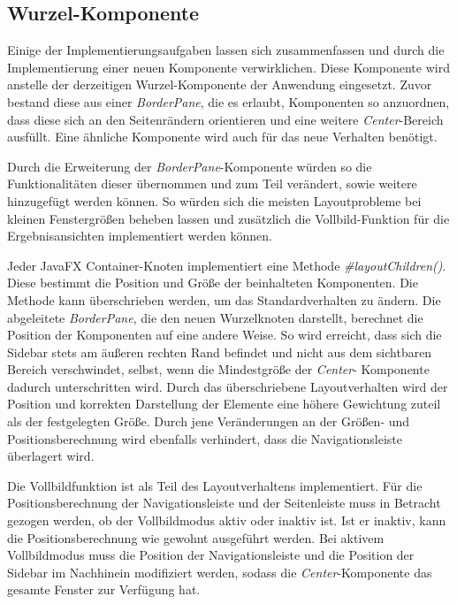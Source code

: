 \subsection{Wurzel-Komponente}
Einige der Implementierungsaufgaben lassen sich zusammenfassen und durch die Implementierung einer neuen Komponente verwirklichen. Diese Komponente wird anstelle der derzeitigen Wurzel-Komponente der Anwendung eingesetzt. Zuvor bestand diese aus einer \textit{BorderPane}, die es erlaubt, Komponenten so anzuordnen, dass diese sich an den Seitenrändern orientieren und eine weitere \textit{Center}-Bereich ausfüllt. Eine ähnliche Komponente wird auch für das neue Verhalten benötigt.\par
Durch die Erweiterung der \textit{BorderPane}-Komponente würden so die Funktionalitäten dieser übernommen und zum Teil verändert, sowie weitere hinzugefügt werden können. So würden sich die meisten Layoutprobleme bei kleinen Fenstergrößen beheben lassen und zusätzlich die Vollbild-Funktion für die Ergebnisansichten implementiert werden können.\par
Jeder JavaFX Container-Knoten implementiert eine Methode \textit{\#{}layoutChildren()}. Diese bestimmt die Position und Größe der beinhalteten Komponenten. Die Methode kann überschrieben werden, um das Standardverhalten zu ändern. Die abgeleitete \textit{BorderPane}, die den neuen Wurzelknoten darstellt, berechnet die Position der Komponenten auf eine andere Weise. So wird erreicht, dass sich die Sidebar stets am äußeren rechten Rand befindet und nicht aus dem sichtbaren Bereich verschwindet, selbst, wenn die Mindestgröße der \textit{Center}- Komponente dadurch unterschritten wird. Durch das überschriebene Layoutverhalten wird der Position und korrekten Darstellung der Elemente eine höhere Gewichtung zuteil als der festgelegten Größe. Durch jene Veränderungen an der Größen- und Positionsberechnung wird ebenfalls verhindert, dass die Navigationsleiste überlagert wird.\par
Die Vollbildfunktion ist als Teil des Layoutverhaltens implementiert. Für die Positionsberechnung der Navigationsleiste und der Seitenleiste muss in Betracht gezogen werden, ob der Vollbildmodus aktiv oder inaktiv ist. Ist er inaktiv, kann die Positionsberechnung wie gewohnt ausgeführt werden. Bei aktivem Vollbildmodus muss die Position der Navigationsleiste und die Position der Sidebar im Nachhinein modifiziert werden, sodass die \textit{Center}-Komponente das gesamte Fenster zur Verfügung hat.\par
